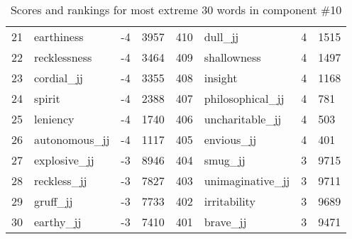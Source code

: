 \begin{table}[tbp]
\begin{tabular}{| rlr@{.}l | rlr@{.}l |}
    21 & earthiness & -4 & 3957    &    410 & dull\_jj & 4 & 1515 \\
    22 & recklessness & -4 & 3464    &    409 & shallowness & 4 & 1497 \\
    23 & cordial\_jj & -4 & 3355    &    408 & insight & 4 & 1168 \\
    24 & spirit & -4 & 2388    &    407 & philosophical\_jj & 4 & 781 \\
    25 & leniency & -4 & 1740    &    406 & uncharitable\_jj & 4 & 503 \\
    26 & autonomous\_jj & -4 & 1117    &    405 & envious\_jj & 4 & 401 \\
    27 & explosive\_jj & -3 & 8946    &    404 & smug\_jj & 3 & 9715 \\
    28 & reckless\_jj & -3 & 7827    &    403 & unimaginative\_jj & 3 & 9711 \\
    29 & gruff\_jj & -3 & 7733    &    402 & irritability & 3 & 9689 \\
    30 & earthy\_jj & -3 & 7410    &    401 & brave\_jj & 3 & 9471 \\
    \hline
    \end{tabular}
    \caption{Scores and rankings for most extreme 30 words in component \#10} 
\end{table}
\clearpage
